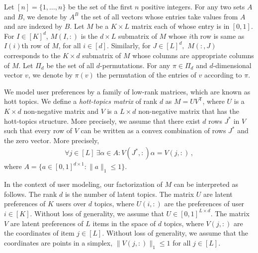 
\newcommand{\transpose}{^\mathsf{\scriptscriptstyle T}}

Let $[n] = \{1, \dots, n\}$ be the set of the first $n$ positive integers. For any two sets $A$ and $B$, we denote by $A^B$ the set of all vectors whose entries take values from $A$ and are indexed by $B$. Let $M$ be a $K \times L$ matrix each of whose entry is in $[0,1]$. For $I \in  [K]^d$, $M(I, :)$ is the $d \times L$ submatrix of $M$ whose $i$th row is same as $I(i)$th row of $M$, for all $ i \in [d]$. Similarly, for $J \in [L]^d,$ $M(:, J)$ corresponds to the $K \times d$ submatrix of $M$ whose columns are appropriate columns of  $M$.  Let $\Pi_d$ be the set of all $d$-permutations. For any $\pi \in \Pi_d$ and $d$-dimensional vector $v$, we denote by $\pi(v)$ the permutation of the entries of $v$ according to $\pi$.  

We model user preferences by a family of low-rank matrices, which are known as hott topics. We define a \emph{hott-topics matrix} of rank $d$ as $M = U V\transpose$, where $U$ is a $K \times d$ non-negative matrix and $V$ is a $L \times d$ non-negative matrix that has the hott-topics structure. More precisely, we assume that there exist $d$ rows $J^\ast$ in $V$ such that every row of $V$ can be written as a convex combination of rows $J^\ast$ and the zero vector. More precisely,
\begin{align}
  \forall j \in [L] \ \exists \alpha \in A: V(J^\ast, :) \alpha = V(j, :)\,,
  \label{eq:hott topics}
\end{align}
where $A = \{a \in [0, 1]^{d \times 1}: \|a\|_1 \leq 1\}$.

In the context of user modeling, our factorization of $M$ can be interpreted as follows. The rank $d$ is the number of latent topics. The matrix $U$ are latent preferences of $K$ users over $d$ topics, where $U(i, :)$ are the preferences of user $i \in [K]$. Without loss of generality, we assume that $U \in [0, 1]^{L \times d}$. The matrix $V$ are latent preferences of $L$ items in the space of $d$ topics, where $V(j, :)$ are the coordinates of item $j \in [L]$. Without loss of generality, we assume that the coordinates are points in a simplex, $\|V(j, :)\|_1 \leq 1$ for all $j \in [L]$.
